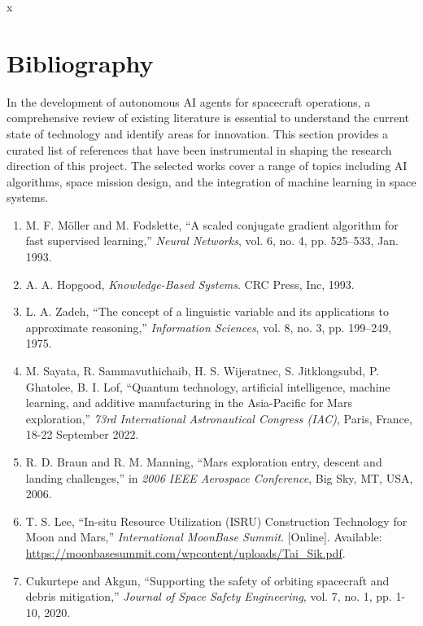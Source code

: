 \documentclass[a4paper,12pt]{article}
\begin{document}
x
\section{Bibliography}

In the development of autonomous AI agents for spacecraft operations, a comprehensive review of existing literature is essential to understand the current state of technology and identify areas for innovation. This section provides a curated list of references that have been instrumental in shaping the research direction of this project. The selected works cover a range of topics including AI algorithms, space mission design, and the integration of machine learning in space systems.

\begin{enumerate}
    \item M. F. Möller and M. Fodslette, “A scaled conjugate gradient algorithm for fast supervised learning,” \textit{Neural Networks}, vol. 6, no. 4, pp. 525–533, Jan. 1993.
    
    \item A. A. Hopgood, \textit{Knowledge-Based Systems}. CRC Press, Inc, 1993.
    
    \item L. A. Zadeh, “The concept of a linguistic variable and its applications to approximate reasoning,” \textit{Information Sciences}, vol. 8, no. 3, pp. 199–249, 1975.
    
    \item M. Sayata, R. Sammavuthichaib, H. S. Wijeratnec, S. Jitklongsubd, P. Ghatolee, B. I. Lof, “Quantum technology, artificial intelligence, machine learning, and additive manufacturing in the Asia-Pacific for Mars exploration,” \textit{73rd International Astronautical Congress (IAC)}, Paris, France, 18-22 September 2022.
    
    \item R. D. Braun and R. M. Manning, “Mars exploration entry, descent and landing challenges,” in \textit{2006 IEEE Aerospace Conference}, Big Sky, MT, USA, 2006.
    
    \item T. S. Lee, “In-situ Resource Utilization (ISRU) Construction Technology for Moon and Mars,” \textit{International MoonBase Summit}. [Online]. Available: \url{https://moonbasesummit.com/wpcontent/uploads/Tai_Sik.pdf}.
    
    \item Cukurtepe and Akgun, “Supporting the safety of orbiting spacecraft and debris mitigation,” \textit{Journal of Space Safety Engineering}, vol. 7, no. 1, pp. 1-10, 2020.
    

\end{enumerate}
\end{document}
